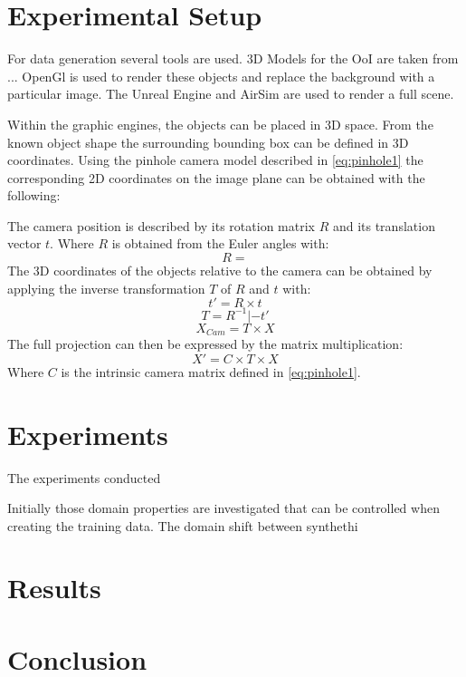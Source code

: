 \section{Experimental Setup}
\label{sec:training:setup}

For data generation several tools are used. 3D Models for the \ac{OoI} are taken from ... OpenGl is used to render these objects and replace the background with a particular image. The Unreal Engine and AirSim are used to render a full scene.

Within the graphic engines, the objects can be placed in 3D space. From the known object shape the surrounding bounding box can be defined in 3D coordinates. Using the pinhole camera model described in \autoref{eq:pinhole1} the corresponding 2D coordinates on the image plane can be obtained with the following:

The camera position is described by its rotation matrix $R$ and its translation vector $t$. Where $R$ is obtained from the Euler angles with:
$$
R =
$$
The 3D coordinates of the objects relative to the camera can be obtained by applying the inverse transformation $T$ of $R$ and $t$ with:
$$
t' = R \times t
$$
$$
T = R^{-1}|-t'
$$
$$
X_{Cam} = T\times X
$$
The full projection can then be expressed by the matrix multiplication:
$$
X' = C\times T\times X
$$
Where $C$ is the intrinsic camera matrix defined in \autoref{eq:pinhole1}.



\section{Experiments}
\label{sec:training:experiments}


The experiments conducted

Initially those domain properties are investigated that can be controlled when creating the training data. The domain shift between synthethi







\section{Results}
\label{sec:training:results}

\section{Conclusion}
\label{sec:training:conclusion}

%
